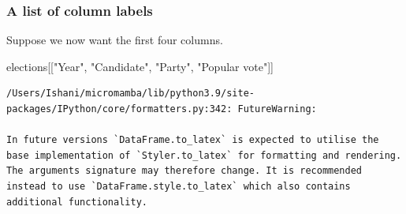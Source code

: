 \documentclass[
  letterpaper,
  DIV=11,
  numbers=noendperiod]{scrreprt}
\newenvironment{Shaded}{\begin{snugshade}}{\end{snugshade}}
\newcommand{\NormalTok}[1]{\textcolor[rgb]{0.00,0.23,0.31}{#1}}
\newcommand{\StringTok}[1]{\textcolor[rgb]{0.13,0.47,0.30}{#1}}
\begin{document}
\hypertarget{a-list-of-column-labels}{%
\subsubsection{A list of column labels}\label{a-list-of-column-labels}}

Suppose we now want the first four columns.

\begin{Shaded}
\begin{Highlighting}[]
\NormalTok{elections[[}\StringTok{"Year"}\NormalTok{, }\StringTok{"Candidate"}\NormalTok{, }\StringTok{"Party"}\NormalTok{, }\StringTok{"Popular vote"}\NormalTok{]]}
\end{Highlighting}
\end{Shaded}

\begin{verbatim}
/Users/Ishani/micromamba/lib/python3.9/site-packages/IPython/core/formatters.py:342: FutureWarning:

In future versions `DataFrame.to_latex` is expected to utilise the base implementation of `Styler.to_latex` for formatting and rendering. The arguments signature may therefore change. It is recommended instead to use `DataFrame.style.to_latex` which also contains additional functionality.
\end{verbatim}
\end{document}

